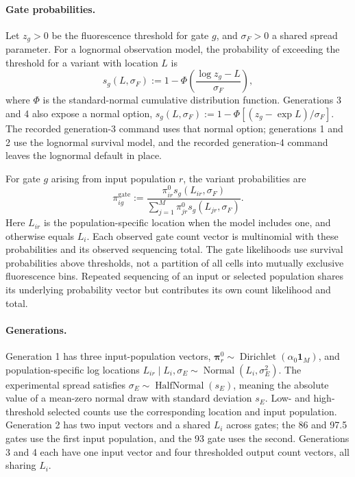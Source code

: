 \paragraph{Gate probabilities.}
Let $z_g>0$ be the fluorescence threshold for gate $g$, and
$\sigma_F>0$ a shared spread parameter. For a lognormal observation model,
the probability of exceeding the threshold for a variant with location $L$
is
\[
s_g(L,\sigma_F):=1-\Phi\!\left(\frac{\log z_g-L}{\sigma_F}\right),
\]
where $\Phi$ is the standard-normal cumulative distribution function.
Generations 3 and 4 also expose a normal option,
$s_g(L,\sigma_F):=1-\Phi[(z_g-\exp L)/\sigma_F]$.
The recorded generation-3 command uses that normal option; generations 1
and 2 use the lognormal survival model, and the recorded generation-4
command leaves the lognormal default in place.

For gate $g$ arising from input population $r$, the variant probabilities
are
\[
\pi_{ig}^{\mathrm{gate}}:=
\frac{\pi_{ir}^0s_g(L_{ir},\sigma_F)}
{\sum_{j=1}^M\pi_{jr}^0s_g(L_{jr},\sigma_F)}.
\]
Here $L_{ir}$ is the population-specific location when the model includes
one, and otherwise equals $L_i$. Each observed gate count vector is
multinomial with these probabilities and its observed sequencing total.
The gate likelihoods use survival probabilities above thresholds, not a
partition of all cells into mutually exclusive fluorescence bins. Repeated
sequencing of an input or selected population shares its underlying probability
vector but contributes its own count likelihood and total.

\paragraph{Generations.}
Generation 1 has three input-population vectors,
$\boldsymbol\pi_r^0\sim\operatorname{Dirichlet}(\alpha_0\mathbf1_M)$,
and population-specific log locations
$L_{ir}\mid L_i,\sigma_E\sim\operatorname{Normal}(L_i,\sigma_E^2)$.
The experimental spread satisfies
$\sigma_E\sim\operatorname{HalfNormal}(s_E)$, meaning the absolute value
of a mean-zero normal draw with standard deviation $s_E$. Low- and high-threshold
selected counts use the corresponding location and input population.
Generation 2 has two input vectors and a shared $L_i$ across gates; the
86 and 97.5 gates use the first input population, and the 93 gate uses the
second. Generations 3 and 4 each have one input vector and four thresholded
output count vectors, all sharing $L_i$.

